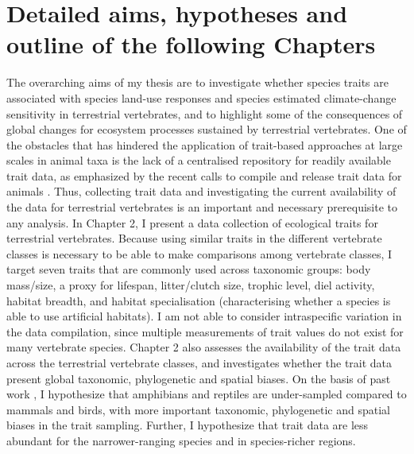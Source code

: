 \section{Detailed aims, hypotheses and outline of the following Chapters}

The overarching aims of my thesis are to investigate whether species traits are associated with species land-use responses and species estimated climate-change sensitivity in terrestrial vertebrates, and to highlight some of the consequences of global changes for ecosystem processes sustained by terrestrial vertebrates. One of the obstacles that has hindered the application of trait-based approaches at large scales in animal taxa is the lack of a centralised repository for readily available trait data, as emphasized by the recent calls to compile and release trait data for animals \citep{Kissling2018, Junker2022}. Thus, collecting trait data and investigating the current availability of the data for terrestrial vertebrates is an important and necessary prerequisite to any analysis. In Chapter 2, I present  a data collection of ecological traits for terrestrial vertebrates. Because using similar traits in the different vertebrate classes is necessary to be able to make comparisons among vertebrate classes, I target seven traits that are commonly used across taxonomic groups: body mass/size, a proxy for lifespan, litter/clutch size, trophic level, diel activity, habitat breadth, and habitat specialisation (characterising whether a species is able to use artificial habitats). I am not able to consider intraspecific variation in the data compilation, since multiple measurements of trait values do not exist for many vertebrate species. Chapter 2 also assesses the availability of the trait data across the terrestrial vertebrate classes, and investigates whether the trait data present global taxonomic, phylogenetic and spatial biases. On the basis of past work \citep{Titley2017}, I hypothesize that amphibians and reptiles are under-sampled compared to mammals and birds, with more important taxonomic, phylogenetic and spatial biases in the trait sampling. Further, I hypothesize that trait data are less abundant for the narrower-ranging species and in species-richer regions. 

